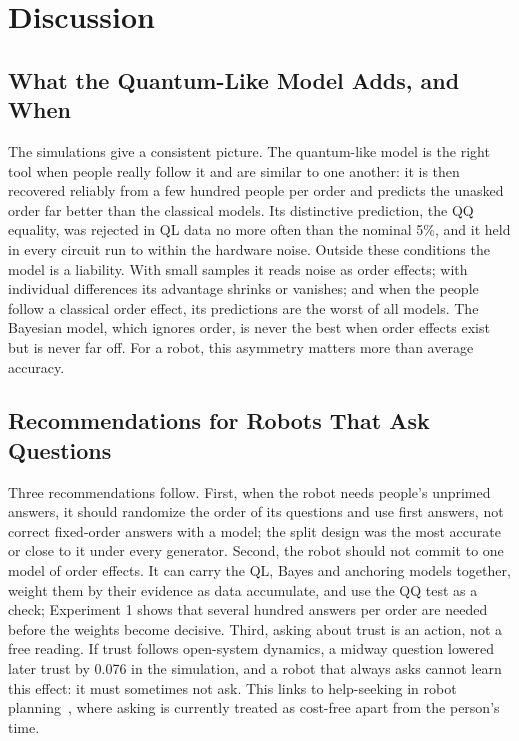 \section{Discussion}\label{sec:discussion}
\subsection{What the Quantum-Like Model Adds, and When}
The simulations give a consistent picture. The quantum-like model is the right tool when people really follow it and are similar to one another: it is then recovered reliably from a few hundred people per order and predicts the unasked order far better than the classical models. Its distinctive prediction, the QQ equality, was rejected in QL data no more often than the nominal 5\%, and it held in every circuit run to within the hardware noise. Outside these conditions the model is a liability. With small samples it reads noise as order effects; with individual differences its advantage shrinks or vanishes; and when the people follow a classical order effect, its predictions are the worst of all models. The Bayesian model, which ignores order, is never the best when order effects exist but is never far off. For a robot, this asymmetry matters more than average accuracy.

\subsection{Recommendations for Robots That Ask Questions}
Three recommendations follow. First, when the robot needs people's unprimed answers, it should randomize the order of its questions and use first answers, not correct fixed-order answers with a model; the split design was the most accurate or close to it under every generator. Second, the robot should not commit to one model of order effects. It can carry the QL, Bayes and anchoring models together, weight them by their evidence as data accumulate, and use the QQ test as a check; Experiment 1 shows that several hundred answers per order are needed before the weights become decisive. Third, asking about trust is an action, not a free reading. If trust follows open-system dynamics, a midway question lowered later trust by 0.076 in the simulation, and a robot that always asks cannot learn this effect: it must sometimes not ask. This links to help-seeking in robot planning~\cite{Ren2023,Yuan2026}, where asking is currently treated as cost-free apart from the person's time.

